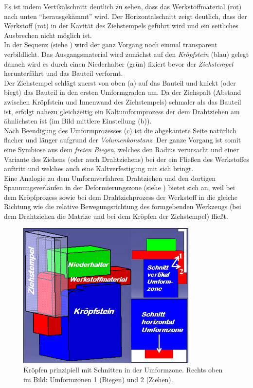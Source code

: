 \documentclass[12pt,a4paper,parskip,twoside,BCOR5mm,headsepline]{scrartcl}
\begin{document}
\begin{description*}
 Es ist indem Vertikalschnitt deutlich zu sehen, dass das Werkstoffmaterial (rot) nach unten "`herausgekämmt"' wird. Der Horizontalschnitt zeigt deutlich,  dass der Werkstoff (rot) in der Kavität des Ziehstempels geführt wird und ein seitliches Ausbrechen nicht möglich ist.\\ In der Sequenz (siehe ) wird der ganz Vorgang noch einmal transparent verbildlicht. Das Ausgangsmaterial wird zunächst auf den \emph{Kröpfstein} (blau) gelegt danach wird es durch einen Niederhalter (grün) fixiert bevor der \emph{Ziehstempel} herunterfährt und das Bauteil verformt. \\    Der Ziehstempel schlägt zuerst von oben  (a) auf das Bauteil  und knickt (oder biegt) das Bauteil in den ersten Umformgraden um. Da der Ziehspalt (Abstand zwischen Kröpfstein und Innenwand des Ziehstempels) schmaler als das Bauteil ist, erfolgt nahezu gleichzeitig  ein Kaltumformprozess der dem Drahtziehen am ähnlichsten ist (im Bild mittlere Einstellung (b)). \\ Nach Beendigung des Umformprozesses (c) ist die abgekantete Seite natürlich flacher und länger aufgrund der \emph{Volumenkonstanz}. Der ganze Vorgang ist somit eine Symbiose aus dem \emph{freien Biegen}, welches den Radius verursacht und einer Variante des Ziehens (oder auch Drahtziehens) bei der ein Fließen des Werkstoffes auftritt und welches auch eine Kaltverfestigung mit sich bringt. \\
Eine Analogie zu dem Umformverfahren Drahtziehen und den dortigen Spannungsverläufen in der Deformierungszone (siehe ) bietet sich an, weil bei dem Kröpfprozess sowie bei dem Drahtziehprozess der Werkstoff in die gleiche Richtung wie die relative Bewegungsrichtung des  formgebenden Werkzeugs (bei dem Drahtziehen die Matrize und bei dem Kröpfen der Ziehstempel) fließt.\\
\begin{figure}[hbtp]
\centering
\includegraphics[width=0.8\textwidth]{krpfgesamt.png}
\caption{Kröpfen prinzipiell mit Schnitten in der Umformzone. Rechts oben im Bild: Umformzonen 1 (Biegen) und 2 (Ziehen).}
\label{fig:krpfgesamt}
\end{figure}




\end{description*}
\end{document}
